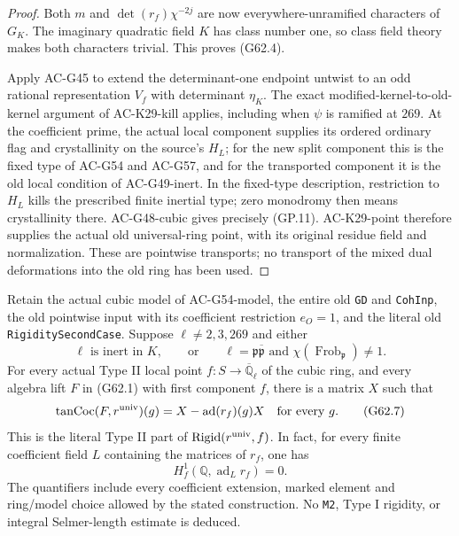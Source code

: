 \begin{proof}
Both $m$ and $\det(r_f)\chi^{-2j}$ are now
everywhere-unramified characters of $G_K$.
The imaginary quadratic field $K$ has class
number one, so class field theory makes both
characters trivial.  This proves (G62.4).

Apply AC-G45 to extend the determinant-one
endpoint untwist to an odd rational representation
$V_f$ with determinant $\eta_K$.
The exact modified-kernel-to-old-kernel argument
of AC-K29-kill applies, including when $\psi$
is ramified at $269$.  At the coefficient prime,
the actual local component supplies its ordered
ordinary flag and crystallinity on the source's
$H_L$; for the new split component this is the
fixed type of AC-G54 and AC-G57, and for the
transported component it is the old local
condition of AC-G49-inert.
In the fixed-type description, restriction to
$H_L$ kills the prescribed finite inertial type;
zero monodromy then means crystallinity there.
AC-G48-cubic gives precisely (GP.11).
AC-K29-point therefore supplies the actual old
universal-ring point, with its original residue
field and normalization.  These are pointwise
transports; no transport of the mixed dual
deformations into the old ring has been used.
\end{proof}

\begin{theorem}
\label{AC-G62}
Retain the actual cubic model of AC-G54-model,
the entire old \texttt{GD} and \texttt{CohInp},
the old pointwise input
 with
its coefficient restriction $e_O=1$, and the
literal old \texttt{RigiditySecondCase}.
Suppose $\ell\ne2,3,269$ and either
\[
 \ell\text{ is inert in }K,\qquad\text{or}\qquad
 \ell=\mathfrak p\overline{\mathfrak p}
   \text{ and }\chi(\operatorname{Frob}_{\mathfrak p})\ne1.
                                                               \tag{G62.6}
\]
For every actual Type II local point
$f:S\to\overline{\mathbb Q}_\ell$ of the cubic ring,
and every algebra lift $F$ in (G62.1) with first
component $f$, there is a matrix $X$ such that
\[
       \operatorname{tanCoc}(F,r^{\rm univ})(g)
             =X-\operatorname{ad}(r_f)(g)X
                         \quad\text{for every }g.       \tag{G62.7}
\]
This is the literal Type II part of
$\operatorname{Rigid}(r^{\rm univ},f)$.
In fact, for every finite coefficient field $L$
containing the matrices of $r_f$, one has
\[
             H_f^1(\mathbb Q,\operatorname{ad}_L r_f)=0.
                                                               \tag{G62.8}
\]
The quantifiers include every coefficient extension,
marked element and ring/model choice allowed by
the stated construction.  No \texttt{M2}, Type I
rigidity, or integral Selmer-length estimate is
deduced.
\end{theorem}

